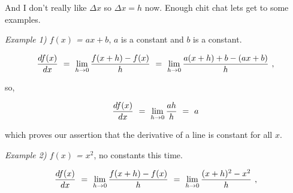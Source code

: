 \documentclass{article}
\begin{document}
And I don't really like \begin{math} \Delta x \end{math} so \begin{math} \Delta x = h \end{math} now. Enough chit chat lets get to some examples. 

\textit{Example 1)  \begin{math} f(x) \end{math} = \begin{math} a x + b \end{math}},  \begin{math} a \end{math} is a constant and \begin{math} b \end{math} is a constant.

\begin{equation} \label{eb-eq-307-1}
\frac{df(x)}{dx} \hspace{0.125cm} = \hspace{0.125cm} \lim_{h\to0} \frac{f(x + h) - f(x)}{h} \hspace{0.125cm} = \hspace{0.125cm} \lim_{h\to0} \frac{a(x + h) + b - (a x + b)}{h} \hspace{0.125cm} ,
\end{equation}

so, 

\begin{equation} \label{eb-eq-308-1}
\frac{df(x)}{dx} \hspace{0.125cm} = \hspace{0.125cm} \lim_{h\to0} \frac{ah}{h} \hspace{0.125cm} = \hspace{0.125cm} a
\end{equation}

which proves our assertion that the derivative of a line is constant for all  \begin{math} x \end{math}. 

\textit{Example 2)  \begin{math} f(x) \end{math} = \begin{math} x^2 \end{math}}, no constants this time.

\begin{equation} \label{eb-eq-309-1}
\frac{df(x)}{dx} \hspace{0.125cm} = \hspace{0.125cm} \lim_{h\to0} \frac{f(x + h) - f(x)}{h} \hspace{0.125cm} = \hspace{0.125cm} \lim_{h\to0} \frac{(x + h)^2 - x^2}{h} \hspace{0.125cm} ,
\end{equation}
\end{document}

